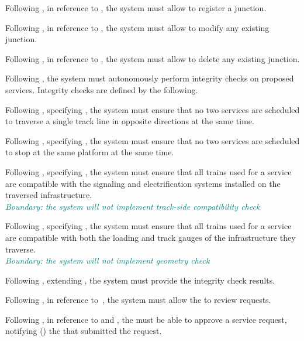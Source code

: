 Following , in reference to , the system must allow  to register a junction.  

Following , in reference to , the system must allow  to modify any existing junction.  

Following , in reference to , the system must allow  to delete any existing junction.  

Following , the system must autonomously perform integrity checks on proposed services.
Integrity checks are defined by the following.

Following , specifying , the system must ensure that no two services are scheduled to traverse a single track line in opposite directions at the same time.

Following , specifying , the system must ensure that no two services are scheduled to stop at the same platform at the same time.

Following , specifying , the system must ensure that all trains used for a service are compatible with the signaling and electrification systems installed on the traversed infrastructure.\\
\textit{\textcolor{teal}{Boundary: the system will not implement track-side compatibility check}}

Following , specifying , the system must ensure that all trains used for a service are compatible with both the loading and track gauges of the infrastructure they traverse.\\
\textit{\textcolor{teal}{Boundary: the system will not implement geometry check}}

Following , extending , the system must provide the integrity check results.

Following , in reference to , the system must allow the  to review requests.

Following , in reference to  and , the  must be able to approve a service request, notifying () the  that submitted the request.

